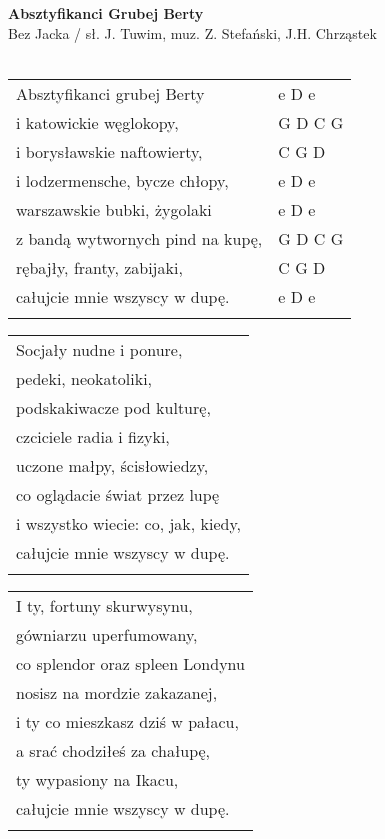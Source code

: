 \documentclass[a5paper]{article}
\begin{document}


\noindent
\fontsize{12pt}{15pt}\selectfont
\textbf{Absztyfikanci Grubej Berty} \\
\fontsize{8pt}{10pt}\selectfont
Bez Jacka / sł. J. Tuwim, muz. Z. Stefański, J.H. Chrząstek \\ \\
\fontsize{10pt}{12pt}\selectfont
{}
\begin{tabular}{@{}p{9.0cm}p{3cm}@{}}
\noindent
Absztyfikanci grubej Berty & e D e \\
i katowickie węglokopy, & G D C G \\
i borysławskie naftowierty, & C G D \\
i lodzermensche, bycze chłopy, & e D e \\
warszawskie bubki, żygolaki & e D e \\
z bandą wytwornych pind na kupę, & G D C G \\
rębajły, franty, zabijaki, & C G D \\
całujcie mnie wszyscy w dupę. & e D e \\ \\
\end{tabular}

\noindent
\begin{tabular}{@{}p{9.5cm}@{}}
Socjały nudne i ponure, \\
pedeki, neokatoliki, \\
podskakiwacze pod kulturę, \\
czciciele radia i fizyki, \\
uczone małpy, ścisłowiedzy, \\
co oglądacie świat przez lupę \\
i wszystko wiecie: co, jak, kiedy, \\
całujcie mnie wszyscy w dupę. \\ \\
\end{tabular}

\noindent
\begin{tabular}{@{}p{9.5cm}@{}}
I ty, fortuny skurwysynu, \\
gówniarzu uperfumowany, \\
co splendor oraz spleen Londynu \\
nosisz na mordzie zakazanej, \\
i ty co mieszkasz dziś w pałacu, \\
a srać chodziłeś za chałupę, \\
ty wypasiony na Ikacu, \\
całujcie mnie wszyscy w dupę. \\ \\
\end{tabular}
\end{document}
